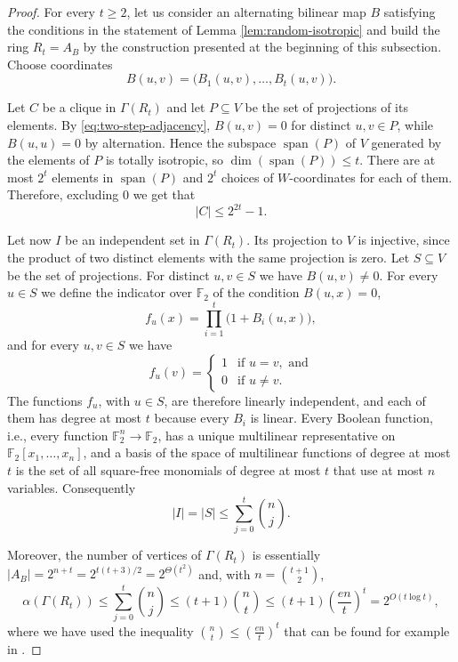 \documentclass[a4paper,11pt]{amsart}
\theoremstyle{definition}
\newcommand{\Span}{\operatorname{span}}
\newcommand{\F}{\mathbb F}
\begin{document}
\superpolylower*
\begin{proof}
    For every $t\geq 2$, let us consider an alternating bilinear map $B$ satisfying the conditions in the statement of Lemma \ref{lem:random-isotropic} and build the ring $R_t=A_B$ by the construction presented at the beginning of this subsection.
Choose coordinates
\[
 B(u,v)=\bigl(B_1(u,v),\ldots,B_t(u,v)\bigr).
\] 

Let $C$ be a clique in $\Gamma(R_t)$ and let $P\subseteq V$ be the set of projections of its
elements.  By \eqref{eq:two-step-adjacency}, $B(u,v)=0$ for distinct
$u,v\in P$, while $B(u,u)=0$ by alternation.  Hence the subspace
$\Span(P)$ of $V$ generated by the elements of $P$ is totally isotropic, so $\dim(\Span(P))\le t$.  There are at most
$2^t$ elements in $\Span(P)$ and $2^t$ choices of $W$-coordinates for each of
them.  Therefore, excluding 0 we get that
\[
 |C|\le2^{2t}-1.
\]

Let now $I$ be an independent set in $\Gamma(R_t)$.  Its projection to $V$ is injective, since the product of two
distinct elements with the same projection is zero.  Let $S\subseteq
V$ be the set of projections.  For distinct $u,v\in S$ we have
$B(u,v)\ne0$.  For every $u\in S$ we define the indicator over $\mathbb F_2$ of the condition $B(u,x)=0$,
\[
 f_u(x)=\prod_{i=1}^t\bigl(1+B_i(u,x)\bigr),
\]
 and for every $u,v\in S$ we have
\[
 f_u(v)=
 \begin{cases}
  1& \text{if }u=v,\text{ and}\\
  0&\text{if }u\ne v.
 \end{cases}
\]
The functions $f_u$, with $u\in S$, are therefore linearly independent, and each of them
has degree at most $t$ because every $B_i$ is linear.  Every Boolean function, i.e., every function $\F_2^n \rightarrow \F_2$, has a unique
multilinear representative on $\mathbb F_2[x_1,\dots,x_n]$, and a basis of the space of multilinear functions of degree at most
$t$ is the set of all square-free monomials of degree at most $t$ that use at most $n$ variables.  Consequently
\[
 |I|=|S|\le\sum_{j=0}^t\binom nj.
\]

Moreover, the number of vertices of $\Gamma(R_t)$ is essentially $|A_B|=2^{n+t}=2^{t(t+3)/2}=2^{\Theta(t^2)}$ and, with $n=\binom{t+1}{2}$,
\[
 \alpha(\Gamma(R_t))\leq\sum_{j=0}^t\binom nj
 \le (t+1)\binom nt
 \le (t+1)\left(\frac{en}{t}\right)^t
 =2^{O(t\log t)},
\] where we have used the inequality ${n\choose t}\leq \left(\frac{en}{t}\right)^t$ that can be found for example in \cite{AS16}.


\end{proof}
\end{document}
